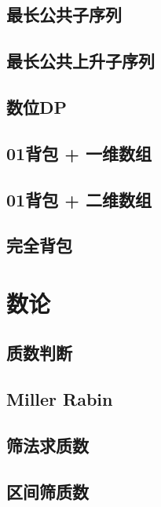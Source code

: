 \documentclass[a4paper, 12pt]{article}
\begin{document}
\subsection{最长公共子序列}

\subsection{最长公共上升子序列}

\subsection{数位DP}

\subsection{01背包 + 一维数组}

\subsection{01背包 + 二维数组}

\subsection{完全背包}


\section{数论}
\subsection{质数判断}

\subsection{Miller Rabin}

\subsection{筛法求质数}

\subsection{区间筛质数}

\end{document}
